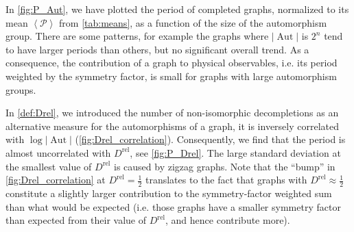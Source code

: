 \documentclass[12pt,a4paper]{article}
\newcommand{\abs}[1]{\lvert #1 \rvert}
\newcommand{\period}{\mathcal P}
\newcommand{\Aut}{\operatorname{Aut}}
\renewcommand{\|}{\rule[-0.4ex]{0.2ex}{1.2em}}
\begin{document}
In \cref{fig:P_Aut}, we have plotted the period of completed graphs, normalized to its mean $\left \langle \period \right \rangle $ from \cref{tab:means}, as a function of the size of the automorphism group. There are some patterns, for example the graphs where $\abs{\Aut}$ is $2^n$ tend to have larger periods than others, but no significant overall trend. As a consequence, the contribution of a graph to physical observables, i.e. its period weighted by the symmetry factor, is small for graphs with large automorphism groups.


In \cref{def:Drel}, we introduced the number of non-isomorphic decompletions
as an alternative measure for the automorphisms of a graph, it is inversely correlated with $\log \abs{\Aut}$ (\cref{fig:Drel_correlation}). Consequently, we find that the period is almost uncorrelated with $D^\text{rel}$, see \cref{fig:P_Drel}. The large standard deviation at the smallest value of $D^\text{rel}$ is caused by zigzag graphs. 
Note that the \enquote{bump} in \cref{fig:Drel_correlation} at $D^\text{rel}=\frac 12$ translates to the fact that  graphs with $D^\text{rel}\approx\frac 12$ constitute a slightly larger contribution to the symmetry-factor weighted sum than what would be expected (i.e. those graphs have a smaller symmetry factor than expected from their value of $D^\text{rel}$, and hence contribute more).
\end{document}
